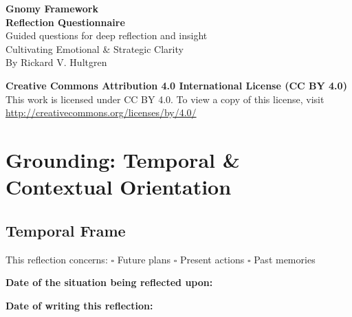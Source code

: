 \documentclass[11pt,a4paper]{article}
\begin{document}
{\centering
\color{gnomyBrown}\textbf{\Huge Gnomy Framework}\\[0.3em]
\color{gnomyBrown}\textbf{\Huge Reflection Questionnaire}\\[0.5em]
\color{gnomyGreen}\large Guided questions for deep reflection and insight\\[0.3em]
\color{gnomyPlum}\normalsize Cultivating Emotional \& Strategic Clarity\\[0.5em]
\color{gray}\normalsize By Rickard V. Hultgren\\
\vspace{0.8em}
}

\begin{licensebox}
  \centering
  \textbf{Creative Commons Attribution 4.0 International License (CC BY 4.0)} \\[0.2em]
  This work is licensed under CC BY 4.0. To view a copy of this license, visit\\
  \url{http://creativecommons.org/licenses/by/4.0/} \\[0.2em]
   
\end{licensebox}

\vspace{0.5em}

\section{Grounding: Temporal \& Contextual Orientation}

\subsection*{Temporal Frame}
This reflection concerns: \hspace{1em} $\square$ Future plans \hspace{1em} $\square$ Present actions \hspace{1em} $\square$ Past memories

\vspace{0.3em}

\noindent\textbf{Date of the situation being reflected upon:}
\begin{answerbox}
\vspace{2em}
\end{answerbox}

\noindent\textbf{Date of writing this reflection:}
\begin{answerbox}
\vspace{2em}
\end{answerbox}
\end{document}
